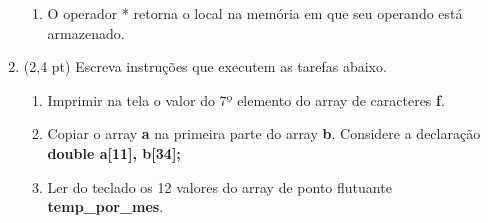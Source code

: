 \documentclass[a4paper,10pt]{article}
\begin{document}
\begin{multicols*}{2}
\begin{enumerate}
\begin{enumerate}
    \item O operador * retorna o local na memória em que seu operando está armazenado.
  \end{enumerate}


  \item (2,4 pt) Escreva instruções que executem as tarefas abaixo.

  \begin{enumerate}

    \item Imprimir na tela o valor do 7º elemento do array de caracteres \textbf{f}.

    \item Copiar o array \textbf{a} na primeira parte do array \textbf{b}. Considere a declaração \textbf{double a[11], b[34];}


    \item Ler do teclado os 12 valores do array de ponto flutuante \textbf{temp\_por\_mes}.


\end{enumerate}
\end{enumerate}
\end{multicols*}
\end{document}
